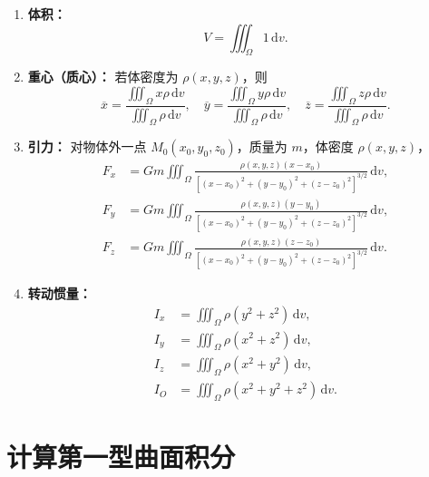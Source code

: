 \begin{enumerate}
      \item \textbf{体积：}
            \[
                  V = \iiint_{\Omega} 1\, \mathrm{d}v.
            \]

      \item \textbf{重心（质心）：}
            若体密度为 $\rho(x,y,z)$，则
            \[
                  \overline{x} = \frac{\iiint_{\Omega} x\rho\, \mathrm{d}v}{\iiint_{\Omega} \rho\, \mathrm{d}v},\quad
                  \overline{y} = \frac{\iiint_{\Omega} y\rho\, \mathrm{d}v}{\iiint_{\Omega} \rho\, \mathrm{d}v},\quad
                  \overline{z} = \frac{\iiint_{\Omega} z\rho\, \mathrm{d}v}{\iiint_{\Omega} \rho\, \mathrm{d}v}.
            \]

      \item \textbf{引力：}
            对物体外一点 $M_0(x_0,y_0,z_0)$，质量为 $m$，体密度 $\rho(x,y,z)$，
            \[
                  \begin{aligned}
                        F_x & = Gm \iiint_{\Omega} \frac{\rho(x,y,z)(x-x_0)}{[(x-x_0)^2+(y-y_0)^2+(z-z_0)^2]^{3/2}}\, \mathrm{d}v, \\
                        F_y & = Gm \iiint_{\Omega} \frac{\rho(x,y,z)(y-y_0)}{[(x-x_0)^2+(y-y_0)^2+(z-z_0)^2]^{3/2}}\, \mathrm{d}v, \\
                        F_z & = Gm \iiint_{\Omega} \frac{\rho(x,y,z)(z-z_0)}{[(x-x_0)^2+(y-y_0)^2+(z-z_0)^2]^{3/2}}\, \mathrm{d}v.
                  \end{aligned}
            \]

      \item \textbf{转动惯量：}
            \[
                  \begin{aligned}
                        I_x & = \iiint_{\Omega} \rho(y^2+z^2)\, \mathrm{d}v,     \\
                        I_y & = \iiint_{\Omega} \rho(x^2+z^2)\, \mathrm{d}v,     \\
                        I_z & = \iiint_{\Omega} \rho(x^2+y^2)\, \mathrm{d}v,     \\
                        I_O & = \iiint_{\Omega} \rho(x^2+y^2+z^2)\, \mathrm{d}v.
                  \end{aligned}
            \]
\end{enumerate}
\section{计算第一型曲面积分}

